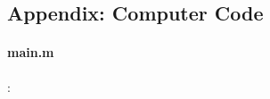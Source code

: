 \documentclass[12pt, letterpaper]{article}  %
\theoremstyle{definition}
\theoremstyle{remark}
\theoremstyle{plain}
\begin{document}




\subsection*{Appendix: Computer Code}
\singlespacing
\paragraph{main.m}:

\end{document}
